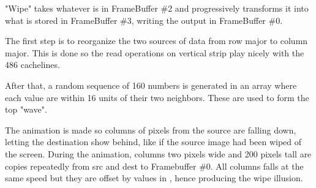 \par
"Wipe" takes whatever is in FrameBuffer \#2 and progressively transforms it into what is stored in FrameBuffer \#3, writing the output in FrameBuffer \#0.\\%
\par
The first step is to reorganize the two sources of data from row major to column major. This is done so the read operations on vertical strip play nicely with the 486 cachelines.\\
\par
{}
\par
After that, a random sequence of 160 numbers is generated in an array  where each value are within 16 units of their two neighbors. These are used to form the top "wave".\\
\par The animation is made so columns of pixels from the source are falling down, letting the destination show behind, like if the source image had been wiped of the screen. During the animation, columns two pixels wide and 200 pixels tall are copies repeatedly from src and dest to Framebuffer \#0. All columns falls at the same speed but they are offset by values in , hence producing the wipe illusion.




